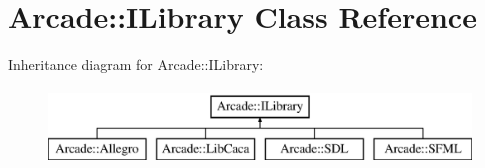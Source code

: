 \hypertarget{class_arcade_1_1_i_library}{}\section{Arcade\+:\+:I\+Library Class Reference}
\label{class_arcade_1_1_i_library}
Inheritance diagram for Arcade\+:\+:I\+Library\+:\begin{figure}[H]
\begin{center}
\leavevmode
\includegraphics[height=2.000000cm]{class_arcade_1_1_i_library}
\end{center}
\end{figure}
